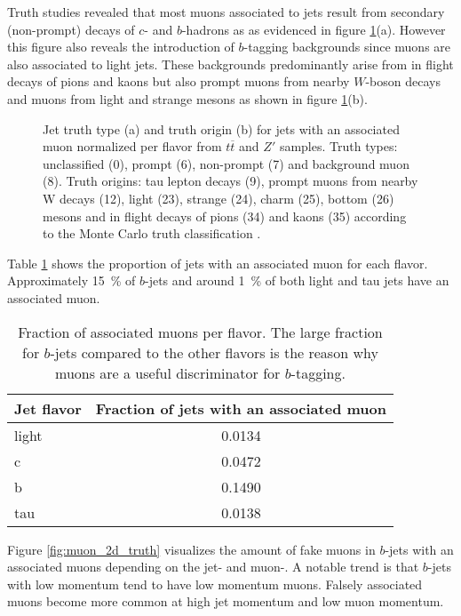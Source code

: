 Truth studies revealed that most muons associated to jets result from secondary (non-prompt) decays of $c$- and $b$-hadrons as as evidenced in figure \ref{fig:muonTruth}(a). However this figure also reveals the introduction of $b$-tagging backgrounds since muons are also associated to light jets. These backgrounds predominantly arise from in flight decays of pions and kaons but also prompt muons from nearby $W$-boson decays and muons from light and strange mesons as shown in figure \ref{fig:muonTruth}(b).
\begin{figure}[htbp]
  \centering
  \caption{Jet truth type (a) and truth origin (b) for jets with an associated muon normalized per flavor from $t\overline{t}$ and $Z'$ samples. Truth types: unclassified (0), prompt (6), non-prompt (7) and background muon (8). Truth origins: tau lepton decays (9), prompt muons from nearby W decays (12), light (23), strange (24), charm (25), bottom (26) mesons and in flight decays of pions (34) and kaons (35) according to the Monte Carlo truth classification \citep{mctruthclassification}.}
  \label{fig:muonTruth}
\end{figure}
Table \ref{tab:MuonJetFlavors} shows the proportion of jets with an associated muon for each flavor. Approximately \qty{15}{\percent} of $b$-jets and around \qty{1}{\percent} of both light and tau jets have an associated muon.
\begin{table}[htbp]
  \caption{Fraction of associated muons per flavor. The large fraction for $b$-jets compared to the other flavors is the reason why muons are a useful discriminator for $b$-tagging. }
  \label{tab:MuonJetFlavors}
  \centering
  \begin{tabular}{ l c }
    \hline
    Jet flavor & Fraction of jets with an associated muon \\
    \hline
    light      & 0.0134                                   \\
    c          & 0.0472                                   \\
    b          & 0.1490                                   \\
    tau        & 0.0138                                   \\
    \hline
  \end{tabular}
\end{table}
Figure \ref{fig:muon_2d_truth} visualizes the amount of fake muons in $b$-jets with an associated muons depending on the jet- and muon-\pt. A notable trend is that $b$-jets with low momentum tend to have low momentum muons. Falsely associated muons become more common at high jet momentum and low muon momentum.
